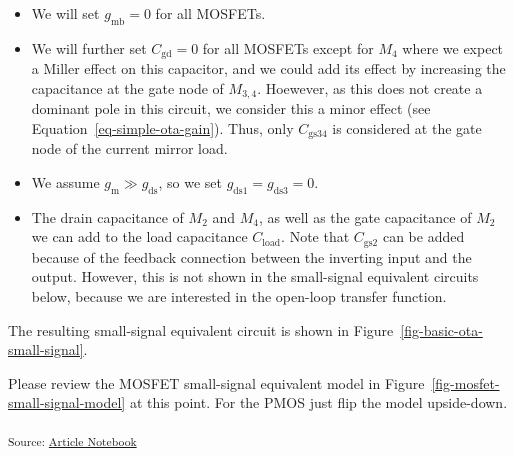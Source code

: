 \documentclass[
  a4paper,
  DIV=11,
  numbers=noendperiod]{scrartcl}
\providecommand{\tightlist}{%
  \setlength{\itemsep}{0pt}\setlength{\parskip}{0pt}}\usepackage{longtable,booktabs,array}
\begin{document}
\begin{itemize}
\tightlist
\item
  We will set \(g_\mathrm{mb}= 0\) for all MOSFETs.
\item
  We will further set \(C_\mathrm{gd}= 0\) for all MOSFETs except for
  \(M_4\) where we expect a Miller effect on this capacitor, and we
  could add its effect by increasing the capacitance at the gate node of
  \(M_{3,4}\). Hoewever, as this does not create a dominant pole in this
  circuit, we consider this a minor effect (see
  Equation~\ref{eq-simple-ota-gain}). Thus, only \(C_\mathrm{gs34}\) is
  considered at the gate node of the current mirror load.
\item
  We assume \(g_\mathrm{m}\gg g_\mathrm{ds}\), so we set
  \(g_\mathrm{ds1} = g_\mathrm{ds3} = 0\).
\item
  The drain capacitance of \(M_2\) and \(M_4\), as well as the gate
  capacitance of \(M_2\) we can add to the load capacitance
  \(C_\mathrm{load}\). Note that \(C_\mathrm{gs2}\) can be added because
  of the feedback connection between the inverting input and the output.
  However, this is not shown in the small-signal equivalent circuits
  below, because we are interested in the open-loop transfer function.
\end{itemize}

The resulting small-signal equivalent circuit is shown in
Figure~\ref{fig-basic-ota-small-signal}.

\begin{tcolorbox}[enhanced jigsaw, breakable, title=\textcolor{quarto-callout-warning-color}{\faExclamationTriangle}\hspace{0.5em}{Refresh MOSFET Small-Signal Model}, left=2mm, bottomrule=.15mm, opacitybacktitle=0.6, opacityback=0, colframe=quarto-callout-warning-color-frame, leftrule=.75mm, bottomtitle=1mm, colbacktitle=quarto-callout-warning-color!10!white, toprule=.15mm, rightrule=.15mm, toptitle=1mm, titlerule=0mm, arc=.35mm, colback=white, coltitle=black]

Please review the MOSFET small-signal equivalent model in
Figure~\ref{fig-mosfet-small-signal-model} at this point. For the PMOS
just flip the model upside-down.

\end{tcolorbox}

\textsubscript{Source:
\href{https://iic-jku.github.io/analog-circuit-design/index.qmd.html}{Article
Notebook}}
\end{document}
